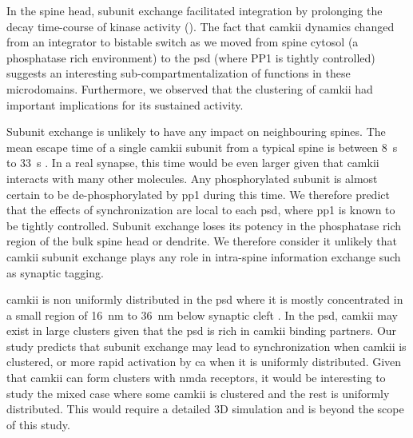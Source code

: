 \documentclass[9pt,lineno,doublespacing]{elife}
\begin{document}
In the spine head, subunit exchange facilitated integration by prolonging the
decay time-course of kinase activity (). The fact that
\gls{camkii} dynamics changed from an integrator to bistable switch as we moved
from spine cytosol (a phosphatase rich environment) to the \gls{psd} (where PP1
is tightly controlled) suggests an interesting sub-compartmentalization of
functions in these microdomains. Furthermore, we observed that the clustering of
\gls{camkii} had important implications for its sustained activity.

Subunit exchange is unlikely to have any impact on neighbouring spines. The mean
escape time of a single \gls{camkii} subunit from a typical spine is between
\SI{8}{\second} to \SI{33}{\second} \citep{holcman_diffusion_2011}. In a real
synapse, this time would be even larger given that \gls{camkii} interacts with
many other molecules. Any phosphorylated subunit is almost certain to be
de-phosphorylated by \gls{pp1} during this time. We therefore predict that the
effects of synchronization are local to each \gls{psd}, where \gls{pp1} is known
to be tightly controlled. Subunit exchange loses its potency in the phosphatase
rich region of the bulk spine head or dendrite. We therefore consider it
unlikely that \gls{camkii} subunit exchange plays any role in intra-spine
information exchange such as synaptic tagging.

\Gls{camkii} is non uniformly distributed in the \gls{psd} where it is mostly
concentrated in a small region of \SI{16}{\nano \meter} to \SI{36}{\nano \meter}
below synaptic cleft \citep{petersen_distribution_2003}. In the \gls{psd},
\gls{camkii} may exist in large clusters given that the \gls{psd} is rich in
\gls{camkii} binding partners. Our study predicts that subunit exchange may
lead to synchronization when \gls{camkii} is clustered, or more rapid activation
by \gls{ca} when it is uniformly distributed. Given that \gls{camkii} can form
clusters with \gls{nmda} receptors, it would be interesting to study the mixed
case where some \gls{camkii} is clustered and the rest is uniformly distributed.
This would require a detailed 3D simulation and is beyond the scope of this 
study.
\end{document}
